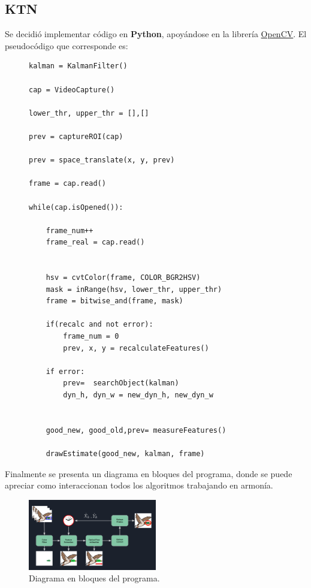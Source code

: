 \begin{itemize}
\subsection{KTN}

Se decidió implementar código en \textbf{Python}, apoyándose en la librería \href{https://opencv.org/}{OpenCV}.
El pseudocódigo que corresponde es:


 
\begin{figure}[H]

\begin{lstlisting}
kalman = KalmanFilter()

cap = VideoCapture()

lower_thr, upper_thr = [],[]

prev = captureROI(cap)

prev = space_translate(x, y, prev)

frame = cap.read()

while(cap.isOpened()):

    frame_num++
    frame_real = cap.read()


    hsv = cvtColor(frame, COLOR_BGR2HSV)
    mask = inRange(hsv, lower_thr, upper_thr)
    frame = bitwise_and(frame, mask)

    if(recalc and not error):
        frame_num = 0
        prev, x, y = recalculateFeatures()

    if error:
        prev=  searchObject(kalman)
        dyn_h, dyn_w = new_dyn_h, new_dyn_w


    good_new, good_old,prev= measureFeatures()

    drawEstimate(good_new, kalman, frame)

\end{lstlisting}
\end{figure} 
 
 Finalmente se presenta un diagrama en bloques del programa, donde se puede apreciar como interaccionan todos los algoritmos trabajando en armonía.
\begin{figure}[H]
\centering
	\includegraphics[width=0.5\textwidth]{Imagenes/diagram.png}
	\caption{Diagrama en bloques del programa.}
	\label{fig:bloques}
\end{figure}



\end{itemize}

